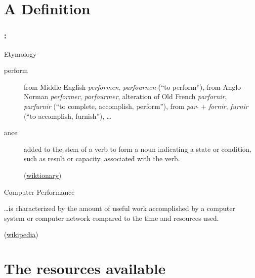 \documentclass[9pt,xcolor=table]{beamer}
\begin{document}
\section{A Definition}
\begin{frame}
\frametitle{\insertsectionhead{} : \insertpart{}
}
\vfill
\begin{block}{Etymology}
  \begin{description}
  \item[perform] from Middle English \textit{performen}, \textit{parfournen} (``to perform''), from Anglo-Norman \textit{performer}, \textit{parfourmer}, alteration of Old French \textit{parfornir}, \textit{parfurnir} (``to complete, accomplish, perform''), from \textit{par}- + \textit{fornir}, \textit{furnir} (``to accomplish, furnish''), \dots
  \item[ance] added to the stem of a verb to form a noun indicating a state or condition, such as result or capacity, associated with the verb.\\
    \begin{flushright}
      \small(\href{http://en.wiktionary.org/wiki/perform}{wiktionary})
    \end{flushright}

  \end{description}
\end{block}
\vfill
\begin{block}{Computer Performance}
  \begin{center}
    \dots is characterized by the amount of useful work accomplished by a computer system or computer network compared to the time and resources used.\\
  \end{center}
  \begin{flushright}
    \small(\href{http://en.wikipedia.org/wiki/Computer_performance}{wikipedia})
  \end{flushright}

  \end{block}
\vfill
\end{frame}

\section[Resources]{The resources available}
\end{document}
